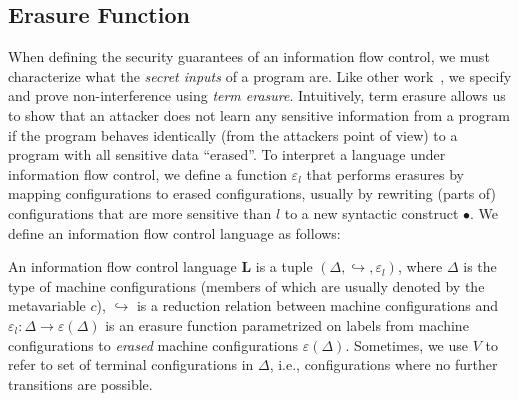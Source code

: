 \documentclass{llncs}
\begin{document}
\subsection{Erasure Function}

When defining the security guarantees of an information flow control,
we must characterize what the \emph{secret inputs} of a program are.  Like
other work~\cite{Li+:2010:arrows,Russo+:Haskell08,lio,stefan:addressing-covert},
we specify and prove non-interference using \emph{term erasure}.
Intuitively, term erasure allows us to show that an attacker does not learn
any sensitive information from a program if the program behaves identically
(from the attackers point of view) to a program with all sensitive data
``erased''.
To interpret a language under information flow control, we define a function \ensuremath{\varepsilon_{l}} that
performs erasures by mapping configurations to erased configurations,
usually by rewriting (parts of) configurations that are more sensitive
than \ensuremath{l} to a new syntactic construct \ensuremath{\bullet}.  We define
an information flow control language as follows:

\begin{definition}
    An information flow control language \ensuremath{\textbf{L}} is a tuple \ensuremath{(\Delta,\hookrightarrow,\varepsilon_{l})}, where $\ensuremath{\Delta}$ is the type of machine configurations (members
    of which are usually denoted by the metavariable \ensuremath{c}), \ensuremath{\hookrightarrow} is a
    reduction relation between machine configurations and \ensuremath{\varepsilon_{l}\mathbin{:}\Delta\rightarrow\varepsilon(\Delta)}
    is an erasure function parametrized on labels from machine configurations to \emph{erased} machine
    configurations \ensuremath{\varepsilon(\Delta)}.  Sometimes, we use \ensuremath{V} to refer to set of
     terminal configurations in \ensuremath{\Delta}, i.e., configurations where
     no further transitions are possible.
\end{definition}
\end{document}
